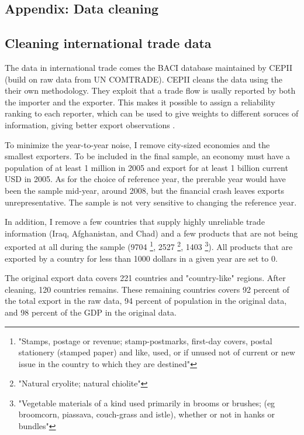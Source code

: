 \documentclass[11pt]{article}
\begin{document}
\begin{appendices}

\newpage

\section{Appendix: Data cleaning}%
\label{sec:appendix_data_cleaning}

\subsection{Cleaning international trade data}%
\label{sub:cleaning_international_trade_data}

The data in international trade comes the BACI database maintained by CEPII (build on raw data from UN COMTRADE). CEPII cleans the data using the their own methodology. They exploit that a trade flow is usally reported by both the importer and the exporter. This makes it possible to assign a reliability ranking to each reporter, which can be used to give weights to different soruces of information, giving better export observations \citep{gualier_baci_2010}. 

To minimize the year-to-year noise, I remove city-sized economies and the smallest exporters. To be included in the final sample, an economy must have a population of at least 1 million in 2005 and export for at least 1 billion current USD in 2005. As for the choice of reference year, the prerable year would have been the sample mid-year, around 2008, but the financial crash leaves exports unrepresentative. The sample is not very sensitive to changing the reference year. 

In addition, I remove a few countries that supply highly unreliable trade information (Iraq, Afghanistan, and Chad) and a few products that are not being exported at all during the sample (9704 \footnote{"Stamps, postage or revenue; stamp-postmarks, first-day covers, postal stationery (stamped paper) and like, used, or if unused not of current or new issue in the country to which they are destined"}, 2527 \footnote{"Natural cryolite; natural chiolite"}, 1403 \footnote{"Vegetable materials of a kind used primarily in brooms or brushes; (eg broomcorn, piassava, couch-grass and istle), whether or not in hanks or bundles"}). All products that are exported by a country for less than 1000 dollars in a given year are set to 0. 

The original export data covers 221 countries and "country-like" regions. After cleaning, 120 countries remains. These remaining countries covers 92 percent of the total export in the raw data, 94 percent of population in the original data, and 98 percent of the GDP in the original data. 


\end{appendices}
\end{document}

